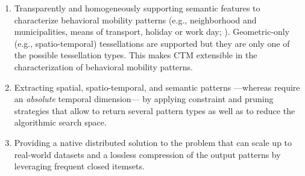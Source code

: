 \documentclass[preprint,12pt,authoryear]{elsarticle} %
\begin{document}
\begin{enumerate}
    \item Transparently and homogeneously supporting semantic features to characterize behavioral mobility patterns (e.g., neighborhood and municipalities, means of transport, holiday or work day; ).
    Geometric-only (e.g., spatio-temporal) tessellations are supported but they are only one of the possible tessellation types.
    This makes CTM extensible in the characterization of behavioral mobility patterns. 
    \item Extracting spatial, spatio-temporal, and semantic patterns ---whereas \cite{DBLP:journals/ijitdm/PhanPT16,DBLP:journals/pvldb/FanZWT16} require an \textit{absolute} temporal dimension--- by applying constraint and pruning strategies that allow to return several pattern types as well as to reduce the algorithmic search space.
    \item Providing a native distributed solution to the problem that can scale up to real-world datasets and a lossless compression of the output patterns by leveraging frequent closed itemsets.
\end{enumerate}
\end{document}
